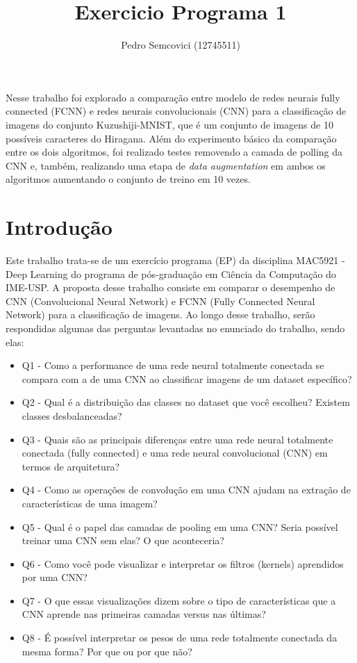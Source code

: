 \documentclass[12pt]{article}
\title{Exercicio Programa 1}
\author{Pedro Semcovici (12745511) }
\begin{document}
 

\maketitle
     
\begin{resumo} 
Nesse trabalho foi explorado a comparação entre modelo de redes neurais fully connected (FCNN) e redes neurais convolucionais (CNN) para a classificação de imagens do conjunto Kuzushiji-MNIST, que é um conjunto de imagens de 10 possíveis caracteres do Hiragana. Além do experimento básico da comparação entre os dois algoritmos, foi realizado testes removendo a camada de polling da CNN e, também, realizando uma etapa de \textit{data augmentation} em ambos os algoritmos aumentando o conjunto de treino em 10 vezes.
\end{resumo}


\section{Introdução}
Este trabalho trata-se de um exercício programa (EP) da  disciplina MAC5921 - Deep Learning do programa de pós-graduação em Ciência da Computação do IME-USP. A proposta desse trabalho consiste em comparar o desempenho de CNN (Convolucional Neural Network) e FCNN (Fully Connected Neural Network) para a classificação de imagens. Ao longo desse trabalho, serão respondidas algumas das perguntas levantadas no enunciado do trabalho, sendo elas:

\begin{itemize}
  \item Q1 - Como a performance de uma rede neural totalmente conectada se compara com a de uma CNN ao classificar imagens de um dataset específico?
  \item Q2 - Qual é a distribuição das classes no dataset que você escolheu? Existem classes desbalanceadas?
  \item Q3 - Quais são as principais diferenças entre uma rede neural totalmente conectada (fully connected) e uma rede neural convolucional (CNN) em termos de arquitetura?
  \item Q4 - Como as operações de convolução em uma CNN ajudam na extração de características de uma imagem?
  \item Q5 - Qual é o papel das camadas de pooling em uma CNN? Seria possível treinar uma CNN sem elas? O que aconteceria?
  \item Q6 - Como você pode visualizar e interpretar os filtros (kernels) aprendidos por uma CNN?
  \item Q7 - O que essas visualizações dizem sobre o tipo de características que a CNN aprende nas primeiras camadas versus nas últimas?
  \item Q8 - É possível interpretar os pesos de uma rede totalmente conectada da mesma forma? Por que ou por que não?
\end{itemize}
\end{document}
